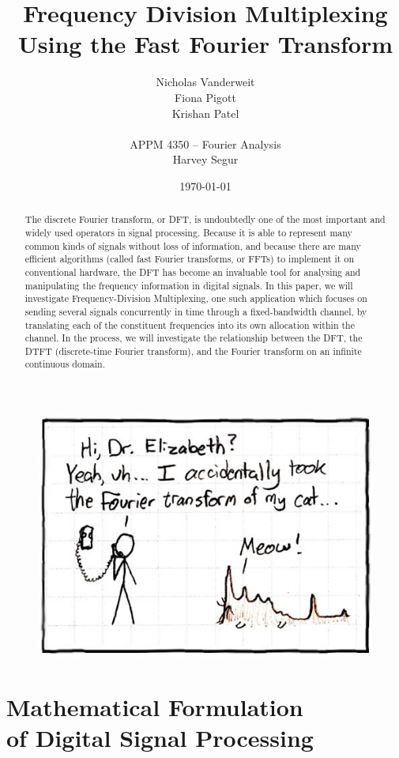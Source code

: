 \documentclass[12pt]{article}
\title{Frequency Division Multiplexing \\Using the Fast Fourier Transform }
\author{Nicholas Vanderweit \\Fiona Pigott \\Krishan Patel \\ \\APPM 4350 --
        Fourier Analysis \\Harvey Segur}
\date{\today}
\begin{document}
\maketitle


\begin{abstract}

The discrete Fourier transform, or DFT, is undoubtedly one of the most
important and widely used operators in signal processing. Because it is
able to represent many common kinds of signals without loss of information, and
because there are many efficient algorithms (called fast Fourier transforms, or
FFTs) to implement it on conventional hardware, the DFT has become an
invaluable tool for analysing and manipulating the frequency information in
digital signals. In this paper, we will investigate Frequency-Division
Multiplexing, one such application which focuses on sending several signals
concurrently in time through a fixed-bandwidth channel, by translating each of
the constituent frequencies into its own allocation within the channel. In the
process, we will investigate the relationship between the DFT, the DTFT
(discrete-time Fourier transform), and the Fourier transform on an infinite
continuous domain.

\end{abstract}

\begin{figure}[H]
\begin{center}
\includegraphics[width=.5\linewidth]{fourier.jpg}
\end{center}
\end{figure}

\clearpage

\section{Mathematical Formulation \\of Digital Signal Processing}
\end{document}
